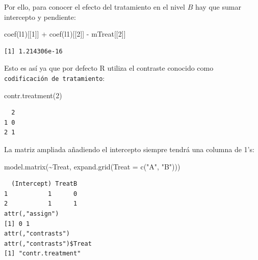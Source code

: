 \documentclass[
  12pt,
  a4paper,
  extrafontsizes,
  onecolumn,
  openright,
  table]{memoir}
\newenvironment{Shaded}{\begin{snugshade}}{\end{snugshade}}
\newcommand{\AttributeTok}[1]{\textcolor[rgb]{0.40,0.45,0.13}{#1}}
\newcommand{\DecValTok}[1]{\textcolor[rgb]{0.68,0.00,0.00}{#1}}
\newcommand{\FunctionTok}[1]{\textcolor[rgb]{0.28,0.35,0.67}{#1}}
\newcommand{\NormalTok}[1]{\textcolor[rgb]{0.00,0.23,0.31}{#1}}
\newcommand{\SpecialCharTok}[1]{\textcolor[rgb]{0.37,0.37,0.37}{#1}}
\newcommand{\StringTok}[1]{\textcolor[rgb]{0.13,0.47,0.30}{#1}}
\begin{document}
Por ello, para conocer el efecto del tratamiento en el nivel \(B\) hay
que sumar intercepto y pendiente:

\scriptsize

\begin{Shaded}
\begin{Highlighting}[]
\FunctionTok{coef}\NormalTok{(l1)[[}\DecValTok{1}\NormalTok{]] }\SpecialCharTok{+} \FunctionTok{coef}\NormalTok{(l1)[[}\DecValTok{2}\NormalTok{]] }\SpecialCharTok{{-}}\NormalTok{ mTreat[[}\DecValTok{2}\NormalTok{]]}
\end{Highlighting}
\end{Shaded}

\begin{verbatim}
[1] 1.214306e-16
\end{verbatim}

\normalsize

Esto es así ya que por defecto R utiliza el contraste conocido como
\texttt{codificación\ de\ tratamiento}:

\scriptsize

\begin{Shaded}
\begin{Highlighting}[]
\FunctionTok{contr.treatment}\NormalTok{(}\DecValTok{2}\NormalTok{)}
\end{Highlighting}
\end{Shaded}

\begin{verbatim}
  2
1 0
2 1
\end{verbatim}

\normalsize

La matriz ampliada añadiendo el intercepto siempre tendrá una columna de
1's:

\scriptsize

\begin{Shaded}
\begin{Highlighting}[]
\FunctionTok{model.matrix}\NormalTok{(}\SpecialCharTok{\textasciitilde{}}\NormalTok{Treat, }\FunctionTok{expand.grid}\NormalTok{(}\AttributeTok{Treat =} \FunctionTok{c}\NormalTok{(}\StringTok{"A"}\NormalTok{, }\StringTok{"B"}\NormalTok{)))}
\end{Highlighting}
\end{Shaded}

\begin{verbatim}
  (Intercept) TreatB
1           1      0
2           1      1
attr(,"assign")
[1] 0 1
attr(,"contrasts")
attr(,"contrasts")$Treat
[1] "contr.treatment"
\end{verbatim}
\end{document}
